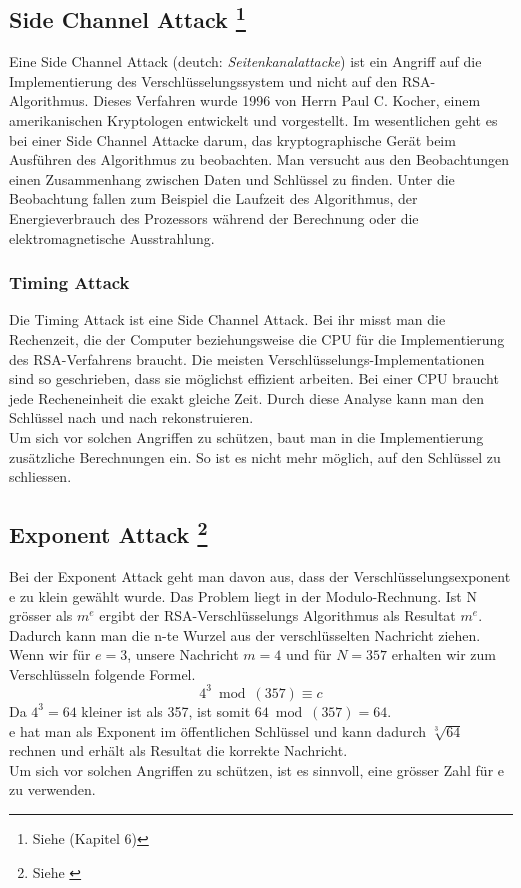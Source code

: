 %
\subsection{Side Channel Attack \footnote{Siehe \cite{rsa_and_public_key} (Kapitel 6)} }
Eine Side Channel Attack (deutch: \textit{Seitenkanalattacke}) ist ein Angriff auf die Implementierung des Verschlüsselungssystem und nicht auf den RSA-Algorithmus. Dieses Verfahren wurde 1996 von Herrn Paul C. Kocher, einem amerikanischen Kryptologen entwickelt und vorgestellt.
Im wesentlichen geht es bei einer Side Channel Attacke darum, das kryptographische Gerät beim Ausführen des Algorithmus zu beobachten.
Man versucht aus den Beobachtungen einen Zusammenhang zwischen Daten und Schlüssel zu finden.
Unter die Beobachtung fallen zum Beispiel die Laufzeit des Algorithmus, der Energieverbrauch des Prozessors während der Berechnung oder die elektromagnetische Ausstrahlung.
%
\subsubsection{Timing Attack}
Die Timing Attack ist eine Side Channel Attack. 
Bei ihr misst man die Rechenzeit, die der Computer beziehungsweise die CPU für die Implementierung des RSA-Verfahrens braucht. Die meisten Verschlüsselungs-Implementationen sind so geschrieben, dass sie möglichst effizient arbeiten. Bei einer CPU braucht jede Recheneinheit die exakt gleiche Zeit. Durch diese Analyse kann man den Schlüssel nach und nach rekonstruieren.\\
%
Um sich vor solchen Angriffen zu schützen, baut man in die Implementierung zusätzliche Berechnungen ein. So ist es nicht mehr möglich, auf den Schlüssel zu schliessen.
%
%
\subsection{Exponent Attack \footnote{Siehe \cite{exponent_Attack}}}
Bei der Exponent Attack geht man davon aus, dass der Verschlüsselungsexponent e zu klein gewählt wurde. Das Problem liegt in der Modulo-Rechnung. Ist N grösser als $m^e$ ergibt der RSA-Verschlüsselungs Algorithmus als Resultat $m^e$. Dadurch kann man die n-te Wurzel aus der verschlüsselten Nachricht ziehen. \\
Wenn wir für $e = 3$, unsere Nachricht $m = 4$ und für $N = 357$ erhalten wir zum Verschlüsseln folgende Formel.
\begin{equation*}
  4^3 \bmod(357) \equiv c
\end{equation*}
Da $4^3 = 64$ kleiner ist als 357, ist somit $64 \bmod(357) = 64$.\\
e hat man als Exponent im öffentlichen Schlüssel und kann dadurch $\sqrt[3]{64}$ rechnen und erhält als Resultat die korrekte Nachricht.\\
%
Um sich vor solchen Angriffen zu schützen, ist es sinnvoll, eine grösser Zahl für e zu verwenden.
